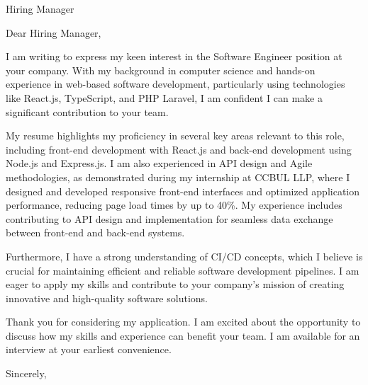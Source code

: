 \documentclass{letter}
\begin{document}
\begin{letter}{Hiring Manager}
\opening{Dear Hiring Manager,}

I am writing to express my keen interest in the Software Engineer position at your company. With my background in computer science and hands-on experience in web-based software development, particularly using technologies like React.js, TypeScript, and PHP Laravel, I am confident I can make a significant contribution to your team.

My resume highlights my proficiency in several key areas relevant to this role, including front-end development with React.js and back-end development using Node.js and Express.js. I am also experienced in API design and Agile methodologies, as demonstrated during my internship at CCBUL LLP, where I designed and developed responsive front-end interfaces and optimized application performance, reducing page load times by up to 40\%. My experience includes contributing to API design and implementation for seamless data exchange between front-end and back-end systems.

Furthermore, I have a strong understanding of CI/CD concepts, which I believe is crucial for maintaining efficient and reliable software development pipelines. I am eager to apply my skills and contribute to your company's mission of creating innovative and high-quality software solutions.

Thank you for considering my application. I am excited about the opportunity to discuss how my skills and experience can benefit your team. I am available for an interview at your earliest convenience.

\closing{Sincerely,}
\signature{Dhiraj Sahu}
\end{letter}
\end{document}

